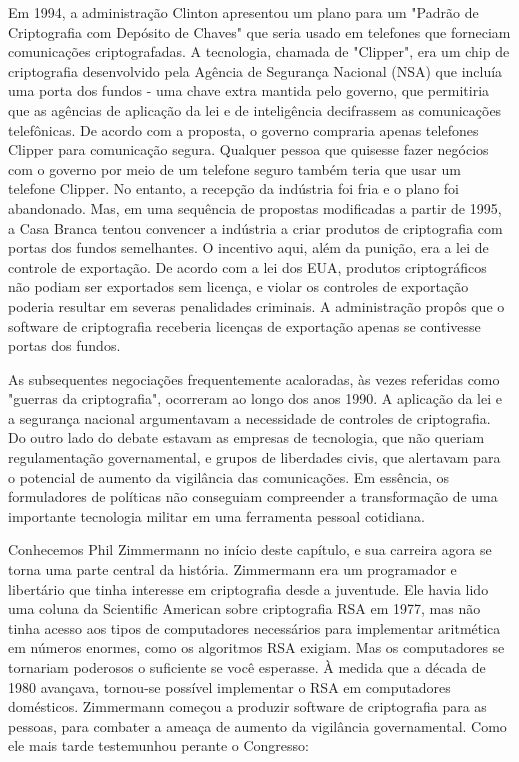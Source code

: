 \documentclass{book}
\begin{document}
Em 1994, a administração Clinton apresentou um plano para um "Padrão de Criptografia com Depósito de Chaves" que seria usado em telefones que forneciam comunicações criptografadas. A tecnologia, chamada de "Clipper", era um chip de criptografia desenvolvido pela Agência de Segurança Nacional (NSA) que incluía uma porta dos fundos - uma chave extra mantida pelo governo, que permitiria que as agências de aplicação da lei e de inteligência decifrassem as comunicações telefônicas. De acordo com a proposta, o governo compraria apenas telefones Clipper para comunicação segura. Qualquer pessoa que quisesse fazer negócios com o governo por meio de um telefone seguro também teria que usar um telefone Clipper. No entanto, a recepção da indústria foi fria e o plano foi abandonado. Mas, em uma sequência de propostas modificadas a partir de 1995, a Casa Branca tentou convencer a indústria a criar produtos de criptografia com portas dos fundos semelhantes. O incentivo aqui, além da punição, era a lei de controle de exportação. De acordo com a lei dos EUA, produtos criptográficos não podiam ser exportados sem licença, e violar os controles de exportação poderia resultar em severas penalidades criminais. A administração propôs que o software de criptografia receberia licenças de exportação apenas se contivesse portas dos fundos.

As subsequentes negociações frequentemente acaloradas, às vezes referidas como "guerras da criptografia", ocorreram ao longo dos anos 1990. A aplicação da lei e a segurança nacional argumentavam a necessidade de controles de criptografia. Do outro lado do debate estavam as empresas de tecnologia, que não queriam regulamentação governamental, e grupos de liberdades civis, que alertavam para o potencial de aumento da vigilância das comunicações. Em essência, os formuladores de políticas não conseguiam compreender a transformação de uma importante tecnologia militar em uma ferramenta pessoal cotidiana.

Conhecemos Phil Zimmermann no início deste capítulo, e sua carreira agora se torna uma parte central da história. Zimmermann era um programador e libertário que tinha interesse em criptografia desde a juventude. Ele havia lido uma coluna da Scientific American sobre criptografia RSA em 1977, mas não tinha acesso aos tipos de computadores necessários para implementar aritmética em números enormes, como os algoritmos RSA exigiam. Mas os computadores se tornariam poderosos o suficiente se você esperasse. À medida que a década de 1980 avançava, tornou-se possível implementar o RSA em computadores domésticos. Zimmermann começou a produzir software de criptografia para as pessoas, para combater a ameaça de aumento da vigilância governamental. Como ele mais tarde testemunhou perante o Congresso:
\end{document}
